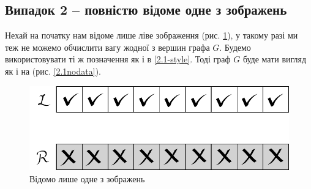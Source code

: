 \documentclass{ConfFTI}
\begin{document}
	

 

\subsection{Випадок 2 -- повністю відоме одне з зображень} \label{2.2}
Нехай на початку нам відоме лише ліве зображення (рис. \ref{2.2oneimage}), у такому разі ми теж не можемо обчислити вагу жодної з вершин графа $G$. Будемо використовувати ті ж позначення як і в  \ref{2.1-style}. Тоді граф $G$ буде мати вигляд як і на (рис. \ref{2.1nodata}).
\begin{figure}[h!]
	\centering
	\includegraphics[scale = 0.5]{allclosed.pdf}
	\caption{Відомо лише одне з зображень}
	\label{2.2oneimage}
\end{figure}
\end{document}
